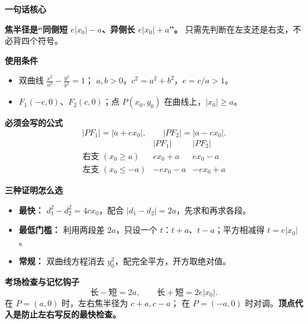\clearpage
\begin{summarybox}

\textbf{\textcolor{CSummary}{一句话核心}}

\textbf{焦半径是“同侧短 $e|x_0|-a$、异侧长 $e|x_0|+a$”。}
只需先判断在左支还是右支，不必背四个符号。

\medskip
\textbf{\textcolor{CSummary}{使用条件}}
\begin{itemize}[leftmargin=*,itemsep=0.3em,topsep=0.3em]
 \item 双曲线 $\frac{x^2}{a^2}-\frac{y^2}{b^2}=1$；
 $a,b>0$，$c^2=a^2+b^2$，$e=c/a>1$。
 \item $F_1(-c,0)$、$F_2(c,0)$；点 $P(x_0,y_0)$ 在曲线上，$|x_0|\ge a$。
\end{itemize}

\medskip
\textbf{\textcolor{CSummary}{必须会写的公式}}
\[
 \boxed{|PF_1|=|a+ex_0|},\qquad
 \boxed{|PF_2|=|a-ex_0|}.
\]
\[
 \begin{array}{c|cc}
  &|PF_1|&|PF_2|\\\hline
  \text{右支 }(x_0\ge a)&ex_0+a&ex_0-a\\
  \text{左支 }(x_0\le-a)&-ex_0-a&-ex_0+a
 \end{array}
\]

\medskip
\textbf{\textcolor{CSummary}{三种证明怎么选}}
\begin{itemize}[leftmargin=*,itemsep=0.35em,topsep=0.3em]
 \item \textbf{最快：} $d_1^2-d_2^2=4cx_0$，配合 $|d_1-d_2|=2a$，先求和再求各段。
 \item \textbf{最低门槛：} 利用两段差 $2a$，只设一个 $t$：$t+a$、$t-a$；平方相减得 $t=e|x_0|$。
 \item \textbf{常规：} 双曲线方程消去 $y_0^2$，配完全平方，开方取绝对值。
\end{itemize}

\medskip
\textbf{\textcolor{CSummary}{考场检查与记忆钩子}}
\[
 \boxed{\text{长}-\text{短}=2a},\qquad
 \boxed{\text{长}+\text{短}=2e|x_0|}.
\]
在 $P=(a,0)$ 时，左右焦半径为 $c+a,c-a$；
在 $P=(-a,0)$ 时对调。\textbf{顶点代入是防止左右写反的最快检查。}

\end{summarybox}
